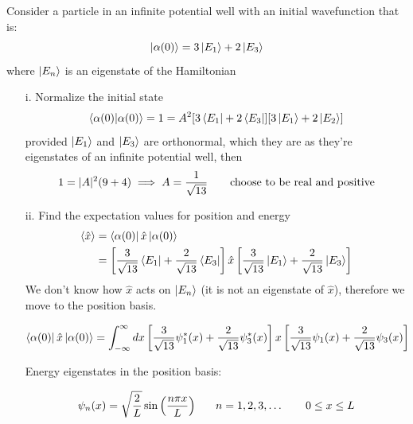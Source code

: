 \documentclass[english, 11pt]{article}
\begin{document}
      \begin{exmp}
        Consider a particle in an infinite potential well with an initial wavefunction that is:
        \[ \left|\alpha(0)\right\rangle = 3\left|E_1\right\rangle + 2\left|E_3\right\rangle \]
        where $\left|E_n\right\rangle$ is an eigenstate of the Hamiltonian
        \begin{itemize}
          \item[i.] Normalize the initial state
          \begin{align*}
            \braket{\alpha(0)}{\alpha(0)} = 1 = A^2[3\bra{E_1} + 2\bra{E_3}][3\ket{E_1} + 2\ket{E_2}]
          \end{align*}
          provided $\left|E_1\right\rangle$ and $\left|E_3\right\rangle$ are orthonormal, which they are as they're eigenstates of an infinite potential well, then
          \[ 1 = |A|^2(9+4) \implies A = \f{1}{\sqrt{13}} \ \ \ \ \ \ \mbox{choose to be real and positive} \]

          \item[ii.] Find the expectation values for position and energy
          \begin{align*}
            \langle \hat{x} \rangle & = \left\langle\alpha(0)\right|\hat{x}\left|\alpha(0)\right\rangle \\
                        & = \left[ \frac{3}{\sqrt{13}} \left\langle E_1\right| + \frac{2}{\sqrt{13}}\left\langle E_3\right| \right]\hat{x}\left[ \frac{3}{\sqrt{13}}\left|E_1\right\rangle + \frac{2}{\sqrt{13}}\left|E_3\right\rangle \right]
          \end{align*}
          We don't know how $\hat{x}$ acts on $\left|E_n\right\rangle$ (it is not an eigenstate of $\hat{x}$), therefore we move to the position basis.

          \[ \left\langle\alpha(0)\right|\hat{x}\left|\alpha(0)\right\rangle = \int_{-\infty}^{\infty} dx \left[ \frac{3}{\sqrt{13}}\psi_1^*(x) + \frac{2}{\sqrt{13}}\psi_3^*(x) \right]x \left[ \frac{3}{\sqrt{13}}\psi_1(x) + \frac{2}{\sqrt{13}}\psi_3(x) \right] \]

          Energy eigenstates in the position basis:

          \[ \psi_n(x) = \sqrt{\frac{2}{L}} \sin \left( \frac{n\pi x}{L} \right)  \ \ \ \ \ n = 1,2,3,\ldots \ \ \ \ \ \ 0 \leq x \leq L\]


\end{itemize}
\end{exmp}
\end{document}
